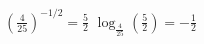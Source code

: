 {$\left(\frac{4}{25}\right)^{-1/2} = \frac{5}{2}$  }
{$\log_{\frac{4}{25}}\left(\frac{5}{2}\right) = -\frac{1}{2}$}